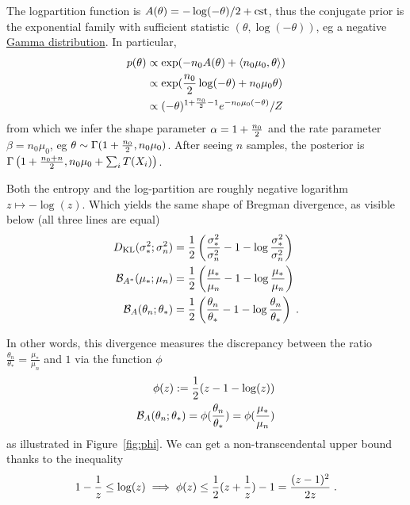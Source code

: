 \documentclass[twoside]{article}
\newcommand{\logpart}{A}
\newcommand{\bregman}{\cB_\logpart}
\newcommand{\bregmanconj}{\cB_{\logpart^*}}
\newcommand{\natp}{\theta}
\begin{document}
The logpartition function is $\logpart(\natp) = -\log(-\natp) /2 + \cst$, thus the conjugate prior is the exponential family with sufficient statistic $(\natp, \log(-\natp) )$, eg a negative \href{https://en.wikipedia.org/wiki/Gamma_distribution}{Gamma distribution}.
In particular,
\begin{align}
	p(\natp) 
	&\propto 
    \exp( -n_0 \logpart (\natp) 
    + \langle n_0 \mu_0, \natp \rangle ) \\
    &\propto \exp( \half[n_0] \log(-\natp) + n_0\mu_0 \natp ) \\
	&\propto (-\natp)^{1 + \half[n_0] -1 } e^{-n_0 \mu_0 (-\natp)} / Z
\end{align}
from which we infer the shape parameter $\alpha=1 + \half[n_0]$ and the rate parameter $\beta = n_0 \mu_0$, eg $\natp \sim \Gamma (1+\half[n_0] , n_0 \mu_0)$. After seeing $n$ samples, the posterior is $\Gamma\left(1+\half[n_0+n] , n_0 \mu_0 + \sum_i T(X_i) \right)$.

Both the entropy and the log-partition are roughly negative logarithm $z\mapsto - \log(z)$. Which yields the same shape of Bregman divergence, as visible below (all three lines are equal)
\begin{align}
	\KL( \sigma_*^2 ; \sigma_n^2 ) 
	&= \half \left ( \frac{\sigma_*^2}{ \sigma_n^2} - 1 - \log \frac{\sigma_*^2}{ \sigma_n^2} \right) \\
	\bregmanconj( \mu_*; \mu_n) 
	&= \half \left ( \frac{\mu_*}{ \mu_n} - 1 - \log  \frac{\mu_*}{ \mu_n} \right) \\
	\bregman( \natp_n; \natp_* ) 
	&=  \half \left ( \frac{ \natp_n}{\natp_*} - 1 - \log  \frac{ \natp_n}{\natp_*} \right) \; .
\end{align}

In other words, this divergence measures the discrepancy between the ratio $\frac{ \natp_n}{\natp_*} =  \frac{\mu_*}{ \mu_n}  $ and $1$ via the function $\phi$
\begin{align}
	\phi(z) := \half (z - 1 - \log(z)) \\
	\bregman( \natp_n; \natp_* )   = \phi(\frac{ \natp_n}{\natp_*}) =  \phi(\frac{\mu_*}{ \mu_n})
\end{align}
as illustrated in Figure~\ref{fig:phi}. We can get a non-transcendental upper bound thanks to the inequality
\begin{align}
	1 - \inv{z} \leq \log(z) 
	\label{eq:log_bound} 
	\implies \phi(z) \leq \half (z + \inv{z}) - 1 = \frac{(z-1)^2}{2 z} \; .
\end{align}
\end{document}
